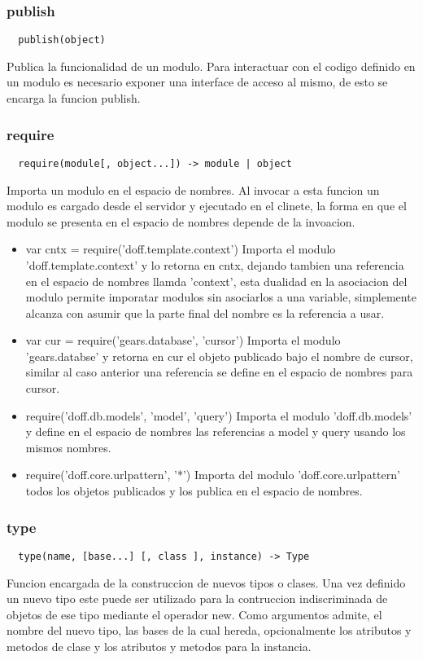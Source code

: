 \subsubsection*{publish}
\begin{verbatim}
  publish(object)
\end{verbatim}
Publica la funcionalidad de un modulo. 
Para interactuar con el codigo definido en un modulo es necesario
exponer una interface de acceso al mismo, de esto se encarga la funcion publish.

\subsubsection*{require}
\begin{verbatim}
  require(module[, object...]) -> module | object
\end{verbatim} 
Importa un modulo en el espacio de nombres.
Al invocar a esta funcion un modulo es cargado desde el servidor y ejecutado en
el clinete, la forma en que el modulo se presenta en el espacio de nombres
depende de la invoacion.
\begin{itemize}
 \item{var cntx = require('doff.template.context')}
  Importa el modulo 'doff.template.context' y lo retorna en cntx, dejando
tambien una referencia en el espacio de nombres llamda 'context', esta dualidad
en la asociacion del modulo permite imporatar modulos sin asociarlos a una
variable, simplemente alcanza con asumir que la parte final del nombre es la
referencia a usar.
 \item{var cur = require('gears.database', 'cursor')}
  Importa el modulo 'gears.databse' y retorna en cur el objeto publicado bajo el
nombre de cursor, similar al caso anterior una referencia se define en el
espacio de nombres para cursor.  
 \item{require('doff.db.models', 'model', 'query')}
  Importa el modulo 'doff.db.models' y define en el espacio de nombres las
referencias a model y query usando los mismos nombres.
 \item{require('doff.core.urlpattern', '*')}
  Importa del modulo 'doff.core.urlpattern' todos los objetos publicados y los
publica en el espacio de nombres.
\end{itemize}

\subsubsection*{type}
\begin{verbatim}
  type(name, [base...] [, class ], instance) -> Type
\end{verbatim} 
Funcion encargada de la construccion de nuevos tipos o clases.
Una vez definido un nuevo tipo este puede ser utilizado para la contruccion
indiscriminada de objetos de ese tipo mediante el operador new.
Como argumentos admite, el nombre del nuevo tipo, las bases de la cual hereda,
opcionalmente los atributos y metodos de clase y los atributos y metodos para la
instancia.

